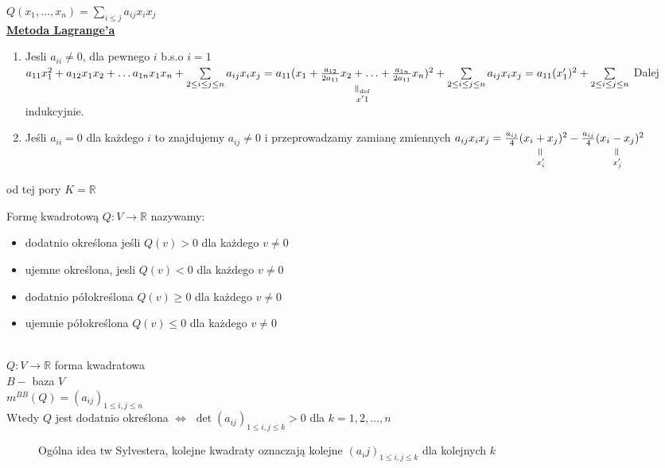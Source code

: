 \begin{dd} 
    $Q(x_1,\ldots,x_n) = \sum\limits_{i \le j} a_{ij} x_i x_j$ \\ 
    \underline{\textbf{Metoda Lagrange'a}} 
    \begin{enumerate}[(1)]
        \item Jesli $a_{ii} \neq 0$, dla pewnego $i$ b.s.o $i = 1$ \\ 
            $a_{11}x_1^2 + a_{12}x_1x_2 + \ldots a_{1n}x_1x_n + \sum\limits_{2 \le i \le j
                \le n} a_{ij}x_ix_j = a_{11}\underscript{(x_1 + \frac{a_{12}}{2a_{11}}x_2 + 
            \ldots + \frac{a_{1n}}{2a_{11}} x_n)^2}{\verteq\text{def}}{x'1} +
            \sum\limits_{2 \le i \le j \le n} a_{ij} x_i x_j = a_{11} (x'_1)^2 + 
            \sum\limits_{2 \le i \le j \le n} $ Dalej indukcyjnie. 
        \item Jeśli $a_{ii} = 0$ dla każdego $i$ to znajdujemy $a_{ij} \neq 0$ i 
            przeprowadzamy zamianę zmiennych $a_{ij}x_i x_j = 
            \frac{a_{ij}}{4} (\underscript{x_i + x_j}{\verteq}{x'_i})^2 - 
            \frac{a_{ij}}{4}(\underscript{x_i - x_j}{\verteq}{x'_j})^2 $
    \end{enumerate}
\end{dd}
od tej pory $K = \mathbb R$
\begin{df} 
    Formę kwadrotową $Q: V \to \mathbb R$ nazywamy: 
    \begin{itemize} 
        \item dodatnio określona jeśli $Q(v) > 0$ dla każdego $v \neq 0$ 
        \item ujemne określona, jesli $Q(v) < 0$ dla każdego $v \neq 0$ 
        \item dodatnio półokreślona $Q(v) \ge 0$ dla każdego $v \neq 0$ 
        \item ujemnie półokreślona $Q(v) \le 0$ dla każdego $v \neq 0$ 
    \end{itemize} 
\end{df} 
\begin{tw}[tw. Sylvestera] ~\\
    $Q: V \to \mathbb R$ forma kwadratowa \\ 
    $B -$ baza $V$ \\ 
    $m^{BB}(Q) = (a_{ij})_{1 \le i, j \le n}$ \\ 
    Wtedy $Q$ jest dodatnio określona $\Leftrightarrow$ $\det(a_{ij})_{1 \le i,j \le k}
    > 0$ dla $k = 1, 2, \ldots, n$
\end{tw} 
\begin{figure} 
    \centering
\caption{Ogólna idea tw Sylvestera, kolejne kwadraty oznaczają kolejne $(a_ij)_{1 \le i,j \le k} $ dla kolejnych $k$}
\end{figure} 
